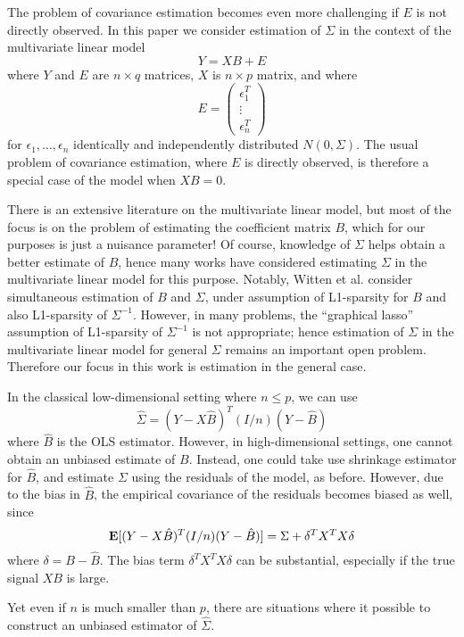 \documentclass[12pt]{article}
\begin{document}
The problem of covariance estimation becomes even more challenging if
$E$ is not directly observed.  In this paper we consider estimation of
$\Sigma$ in the context of the multivariate linear model
\[Y = XB + E\]
where $Y$ and $E$ are $n \times q$ matrices, $X$ is $n \times p$
matrix, and where
\[E = \begin{pmatrix}\epsilon_1^T \\ \vdots \\ \epsilon_n^T \end{pmatrix}\]
for $\epsilon_1,\hdots, \epsilon_n$ identically and independently
distributed $N(0, \Sigma)$.  The usual problem of covariance
estimation, where $E$ is directly observed, is therefore a special
case of the model when $XB = 0$.

There is an extensive literature on the multivariate linear model, but
most of the focus is on the problem of estimating the coefficient
matrix $B$, which for our purposes is just a nuisance parameter!  Of
course, knowledge of $\Sigma$ helps obtain a better estimate of $B$,
hence many works have considered estimating $\Sigma$ in the
multivariate linear model for this purpose.  Notably, Witten et
al. consider simultaneous estimation of $B$ and $\Sigma$, under
assumption of L1-sparsity for $B$ and also L1-sparsity of
$\Sigma^{-1}$.  However, in many problems, the ``graphical lasso''
assumption of L1-sparsity of $\Sigma^{-1}$ is not appropriate; hence
estimation of $\Sigma$ in the multivariate linear model for general
$\Sigma$ remains an important open problem.  Therefore our focus in
this work is estimation in the general case.

In the classical low-dimensional setting where $n \leq p$, we can use
\[
\hat{\Sigma} = (Y-X\hat{B})^T(I/n)(Y-\hat{B})
\]
where $\hat{B}$ is the OLS estimator. However, in high-dimensional
settings, one cannot obtain an unbiased estimate of $B$.  Instead, one
could take use shrinkage estimator for $\hat{B}$, and estimate
$\Sigma$ using the residuals of the model, as before.  However, due to
the bias in $\hat{B}$, the empirical covariance of the residuals
becomes biased as well, since
\[
\textbf{E}[(Y-X\hat{B})^T(I/n)(Y-\hat{B})] = \Sigma + \delta^T X^T X \delta
\]
where $\delta = B-\hat{B}$.  The bias term $\delta^T X^T X \delta$ can
be substantial, especially if the true signal $XB$ is large.

Yet even if $n$ is much smaller than $p$, there are situations where
it possible to construct an unbiased estimator of $\hat{\Sigma}$.
\end{document}
